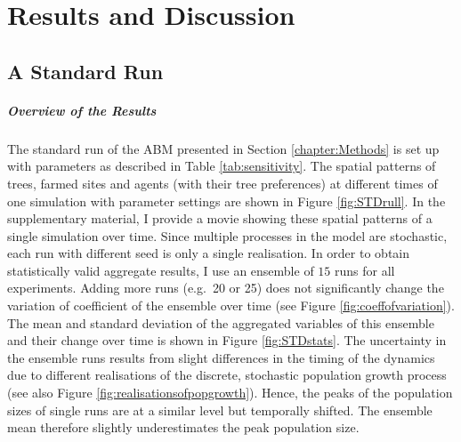 \chapter{Results and Discussion}\label{chapter:Results}
\FloatBarrier
\section{A Standard Run}
\paragraph{Overview of the Results}
The standard run of the ABM presented in Section \ref{chapter:Methods} 
is set up with parameters as described in Table \ref{tab:sensitivity}.
The spatial patterns of trees, farmed sites and agents (with their tree preferences) at different times of one simulation with parameter settings are shown in Figure \ref{fig:STDrull}.
In the supplementary material, I provide a movie showing these spatial patterns of a single simulation over time. \TODO
Since multiple processes in the model are stochastic, each run with different seed is only a single realisation.
In order to obtain statistically valid aggregate results, I use an ensemble of $15$ runs for all experiments.
Adding more runs (e.g.\ 20 or 25) does not significantly change the variation of coefficient of the ensemble over time (see Figure \ref{fig:coeffofvariation}).
The mean and standard deviation of the aggregated variables of this ensemble and their change over time is shown in Figure \ref{fig:STDstats}.
The uncertainty in the ensemble runs results from slight differences in the timing of the dynamics due to different realisations of the discrete, stochastic population growth process (see also Figure \ref{fig:realisationsofpopgrowth}). 
Hence, the peaks of the population sizes of single runs are at a similar level but temporally shifted. 
The ensemble mean therefore slightly underestimates the peak population size.

